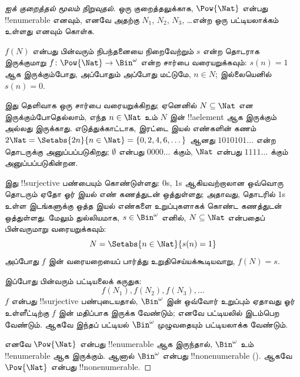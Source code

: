 \documentclass[../../../include/open-logic-section]{subfiles}
\begin{document}
\begin{proof}[{} ஐக் குறைத்தல் மூலம் நிறுவுதல்]
ஒரு குறைத்தலுக்காக, $\Pow{\Nat}$ என்பது !!{enumerable} எனவும்,
எனவே அதற்கு $N_{1}$, $N_{2}$, $N_{3}$, \dots என்ற
ஒரு பட்டியலாக்கம் உள்ளது எனவும் கொள்க.

$f(N)$ என்பது பின்வரும் நிபந்தனையை நிறைவேற்றும் $s$ என்ற
தொடராக இருக்குமாறு $f \colon \Pow{\Nat} \to \Bin^\omega$
என்ற சார்பை வரையறுக்கவும்:
$s(n) = 1$ ஆக இருக்கும்போது, அப்போதும் அப்போது மட்டுமே,
$n \in N$; இல்லையெனில் $s(n) = 0$.

இது தெளிவாக ஒரு சார்பை வரையறுக்கிறது;
ஏனெனில் $N \subseteq \Nat$ என இருக்கும்போதெல்லாம்,
எந்த $n \in \Nat$ உம் $N$ இன் !!a{element} ஆக இருக்கும் அல்லது இருக்காது.
எடுத்துக்காட்டாக, இரட்டை இயல் எண்களின் கணம்
$2\Nat = \Setabs{2n}{n \in \Nat} = \{0,2, 4, 6,
\dots\}$ ஆனது $1010101\dots$ என்ற தொடருக்கு அனுப்பப்படுகிறது;
$\emptyset$ என்பது $0000\dots$ க்கும்,
$\Nat$ என்பது $1111\dots$ க்கும் அனுப்பப்படுகின்றன.

இது !!{surjective} பண்பையும் கொண்டுள்ளது:
$0$s, $1$s ஆகியவற்றாலான ஒவ்வொரு தொடரும் ஏதோ ஓர் இயல் எண் கணத்துடன்
ஒத்துள்ளது; அதாவது, தொடரில் $1$s உள்ள இடங்களுக்கு ஒத்த இயல் எண்களை
உறுப்புகளாகக் கொண்ட கணத்துடன் ஒத்துள்ளது.
மேலும் துல்லியமாக, $s \in \Bin^\omega$ எனில்,
$N \subseteq \Nat$ என்பதைப் பின்வருமாறு வரையறுக்கவும்:
\[
N = \Setabs{n \in \Nat}{s(n) = 1}
\]
அப்போது $f$ இன் வரையறையைப் பார்த்து உறுதிசெய்யக்கூடியவாறு,
$f(N) = s$.

இப்போது பின்வரும் பட்டியலைக் கருதுக:
\[
f(N_1), f(N_2), f(N_3), \dots
\]
$f$ என்பது !!{surjective} பண்புடையதால்,
$\Bin^\omega$ இன் ஒவ்வோர் உறுப்பும் ஏதாவது ஓர் உள்ளீட்டிற்கு
$f$ இன் மதிப்பாக இருக்க வேண்டும்; எனவே பட்டியலில் இடம்பெற வேண்டும்.
ஆகவே இந்தப் பட்டியல் $\Bin^\omega$ முழுவதையும் பட்டியலாக்க வேண்டும்.

எனவே $\Pow{\Nat}$ என்பது !!{enumerable} ஆக இருந்தால்,
$\Bin^\omega$ உம் !!{enumerable} ஆக இருக்கும்.
ஆனால் $\Bin^\omega$ என்பது !!{nonenumerable}
().
ஆகவே $\Pow{\Nat}$ என்பது !!{nonenumerable}.
\end{proof}

\end{document}
